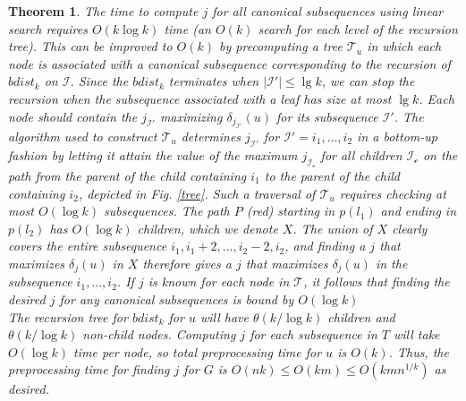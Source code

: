 \documentclass[12pt]{article}
\newtheorem{thm}{Theorem}[section]
\begin{document}
\begin{thm}
The time to compute $j$ for all canonical subsequences using linear search requires $O(k\log k)$ time (an $O(k)$ search for each level of the recursion tree). This can be improved to $O(k)$ by precomputing a tree $\mathcal{T}_u$ in which each node is associated with a canonical subsequence corresponding to the recursion of $bdist_k$ on $\mathcal{I}$. Since the $bdist_k$ terminates when $|\mathcal{I}'| \leq \lg k$, we can stop the recursion when the subsequence associated with a leaf has size at most $\lg k$. Each node should contain the $j_{\mathcal{I}'}$ maximizing $\delta_{j_{\mathcal{I}'}}(u)$ for its subsequence $\mathcal{I}'$. The algorithm used to construct $\mathcal{T}_u$ determines $j_{\mathcal{I}'}$ for $\mathcal{I}'=i_1,\hdots,i_2$ in a bottom-up fashion by letting it attain the value of the maximum $j_{\mathcal{I_c}}$ for all children $\mathcal{I_c}$ on the path from the parent of the child containing $i_1$ to the parent of the child containing $i_2$, depicted in Fig. \ref{tree}. Such a traversal of $\mathcal{T}_u$ requires checking at most $O(\log k)$ subsequences. The path $P$ (red) starting in $p(l_1)$ and ending in $p(l_2)$ has $O(\log k)$ children, which we denote $X$. The union of $X$ clearly covers the entire subsequence $i_1,i_1+2,...,i_2-2,i_2$, and finding a $j$ that maximizes $\delta_j(u)$ in $X$ therefore gives a $j$ that maximizes $\delta_j(u)$ in the subsequence $i_1,...,i_2$. If $j$ is known for each node in $\mathcal{T}$, it follows that finding the desired $j$ for any canonical subsequences is bound by $O(\log k)$\\

The recursion tree for $bdist_k$ for $u$ will have $\theta(k/\log k)$ children and $\theta(k/\log k)$ non-child nodes. Computing $j$ for each subsequence in $T$ will take $O(\log k)$ time per node, so total preprocessing time for $u$ is $O(k)$. Thus, the preprocessing time for finding $j$ for $G$ is $O(nk)\leq O(km)\leq O(kmn^{1/k})$ as desired.
\end{thm}
\end{document}
